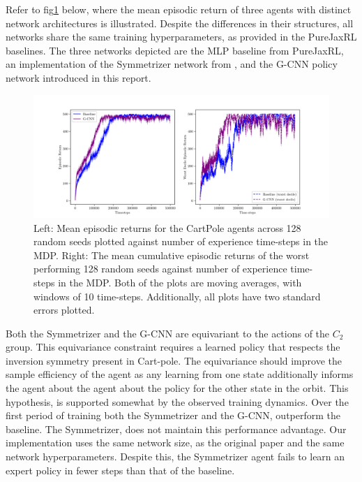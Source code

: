 Refer to fig\ref{fig:cartpole_equivariant_actor} below, where the mean episodic return of three agents with distinct network architectures is illustrated. Despite the differences in their structures, all networks share the same training hyperparameters, as provided in the PureJaxRL\cite{lu2022discovered} baselines. The three networks depicted are the MLP baseline from PureJaxRL, an implementation of the Symmetrizer network from \cite{vanderpol2020mdp}, and the G-CNN policy network introduced in this report.

\begin{figure}[H]
	\centering
	\includegraphics[width=\linewidth]{Figures/cart_pole_returns.png}
	\caption{Left: Mean episodic returns for the CartPole agents across 128 random seeds plotted against number of experience time-steps in the MDP. Right: The mean cumulative episodic returns of the worst performing 128 random seeds against number of experience time-steps in the MDP. Both of the plots are moving averages, with windows of 10 time-steps. Additionally, all plots have two standard errors plotted. } \label{fig:cartpole_equivariant_actor}
\end{figure}

Both the Symmetrizer and the G-CNN are equivariant to the actions of the $C_2$ group. This equivariance constraint requires a learned policy that respects the inversion symmetry present in Cart-pole. The equivariance  should improve the sample efficiency of the agent as any learning from one state additionally informs the agent about the agent about the policy for the other state in the orbit. This hypothesis, is supported somewhat by the observed training dynamics. Over the first period of training both the Symmetrizer and the G-CNN, outperform the baseline. The Symmetrizer, does not maintain this performance advantage. Our implementation uses the same network size, as the original paper and the same network hyperparameters. Despite this, the Symmetrizer agent fails to learn an expert policy in fewer steps than that of the baseline.

